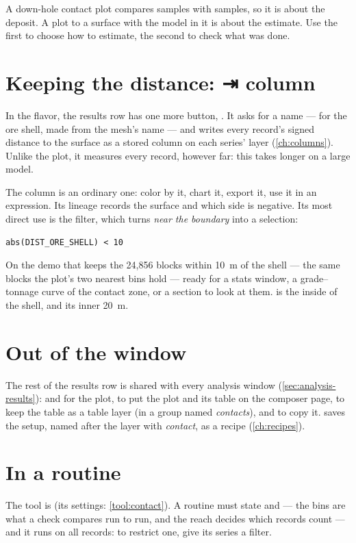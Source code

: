 \begin{note}
A down-hole contact plot compares samples with samples, so it is about the deposit. A plot to a surface with the model in it is about the estimate. Use the first to choose how to estimate, the second to check what was done.
\end{note}

\section{Keeping the distance: ⇥ column}\label{sec:contact-column}
In the  flavor, the results row has one more button, . It asks for a name —  for the ore shell, made from the mesh's name — and writes every record's signed distance to the surface as a stored column on each series' layer (\cref{ch:columns}). Unlike the plot, it measures every record, however far: this takes longer on a large model.

The column is an ordinary one: color by it, chart it, export it, use it in an expression. Its lineage records the surface and which side is negative. Its most direct use is the filter, which turns \emph{near the boundary} into a selection:

\begin{lstlisting}[language=expr]
abs(DIST_ORE_SHELL) < 10
\end{lstlisting}

On the demo that keeps the 24,856 blocks within 10~m of the shell — the same blocks the plot's two nearest bins hold — ready for a stats window, a grade–tonnage curve of the contact zone, or a section to look at them.  is the inside of the shell, and  its inner 20~m.

\section{Out of the window}
The rest of the results row is shared with every analysis window (\cref{sec:analysis-results}):  and  for the plot,  to put the plot and its table on the composer page,  to keep the table as a table layer (in a group named \emph{contacts}), and  to copy it.  saves the setup, named after the layer with \emph{contact}, as a recipe (\cref{ch:recipes}).

\section{In a routine}\label{sec:contact-routine}
The tool is  (its settings: \cref{tool:contact}). A routine must state  and  — the bins are what a check compares run to run, and the reach decides which records count — and it runs on all records: to restrict one, give its series a filter.


